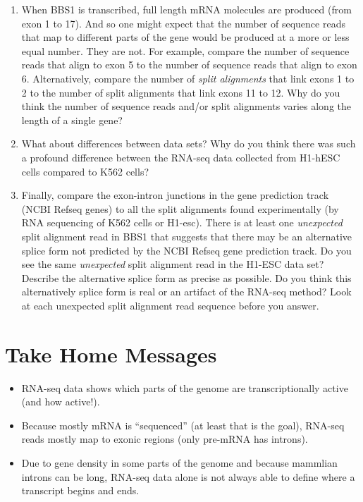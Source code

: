 \documentclass[
]{book}
\providecommand{\tightlist}{%
  \setlength{\itemsep}{0pt}\setlength{\parskip}{0pt}}
\begin{document}
\begin{enumerate}
\def\labelenumi{\arabic{enumi}.}
\tightlist
\item
  When BBS1 is transcribed, full length mRNA molecules are produced (from exon 1 to 17). And so one might expect that the number of sequence reads that map to different parts of the gene would be produced at a more or less equal number. They are not. For example, compare the number of sequence reads that align to exon 5 to the number of sequence reads that align to exon 6. Alternatively, compare the number of \emph{split alignments} that link exons 1 to 2 to the number of split alignments that link exons 11 to 12. Why do you think the number of sequence reads and/or split alignments varies along the length of a single gene?
\item
  What about differences between data sets? Why do you think there was such a profound difference between the RNA-seq data collected from H1-hESC cells compared to K562 cells?
\item
  Finally, compare the exon-intron junctions in the gene prediction track (NCBI Refseq genes) to all the split alignments found experimentally (by RNA sequencing of K562 cells or H1-esc). There is at least one \emph{unexpected} split alignment read in BBS1 that suggests that there may be an alternative splice form not predicted by the NCBI Refseq gene prediction track. Do you see the same \emph{unexpected} split alignment read in the H1-ESC data set? Describe the alternative splice form as precise as possible. Do you think this alternatively splice form is real or an artifact of the RNA-seq method? Look at each unexpected split alignment read sequence before you answer.
\end{enumerate}

\hypertarget{take-home-messages}{%
\section{Take Home Messages}\label{take-home-messages}}

\begin{itemize}
\tightlist
\item
  RNA-seq data shows which parts of the genome are transcriptionally active (and how active!).
\item
  Because mostly mRNA is ``sequenced'' (at least that is the goal), RNA-seq reads mostly map to exonic regions (only pre-mRNA has introns).
\item
  Due to gene density in some parts of the genome and because mammlian introns can be long, RNA-seq data alone is not always able to define where a transcript begins and ends.\\
\end{itemize}
\end{document}
